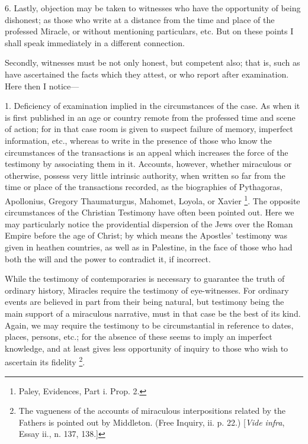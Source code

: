 6. Lastly, objection may be taken to witnesses
who have the opportunity of being dishonest; as those who write at a
distance from the time and place of the professed Miracle, or without
mentioning particulars, etc. But on these points I shall speak
immediately in a different connection.

Secondly, witnesses must be not only honest, but
competent also; that is, such as have ascertained the facts which they
attest, or who report after examination. Here then I notice—

1. Deficiency of examination implied in the
circumstances of the case. As when it is first published in an age or
country remote from the professed time and scene of action; for in
that case room is given to suspect failure of memory, imperfect
information, etc., whereas to write in the presence of those who know
the circumstances of the transactions is an appeal which increases the
force of the testimony by associating them in it. Accounts, however,
whether miraculous or otherwise, possess very little intrinsic
authority, when written so far from the time or place of the
transactions recorded, as the biographies of Pythagoras, Apollonius,
Gregory Thaumaturgus, Mahomet, Loyola, or Xavier \footnote{Paley, Evidences, Part i. Prop. 2.}. The opposite circumstances of the Christian Testimony have
often been pointed out. Here we may particularly notice the
providential dispersion of the Jews over the Roman Empire before the
age of Christ; by which means the Apostles' testimony was given in
heathen countries, as well as in Palestine, in the face of those who
had both the will and the power to contradict it, if incorrect.

While the testimony of contemporaries is
necessary to guarantee the truth of ordinary history, Miracles require
the testimony of eye-witnesses. For ordinary events are believed in
part from their being natural, but testimony being the main support of
a miraculous narrative, must in that case be the best of its kind.
Again, we may require the testimony to be circumstantial in reference
to dates, places, persons, etc.; for the absence of these seems to
imply an imperfect knowledge, and at least gives less opportunity of
inquiry to those who wish to ascertain its fidelity \footnote{The vagueness of the accounts of miraculous interpositions related by
the Fathers is pointed out by Middleton. (Free Inquiry, ii. p. 22.) [\emph{Vide
infra}, Essay ii., n. 137, 138.]}.

